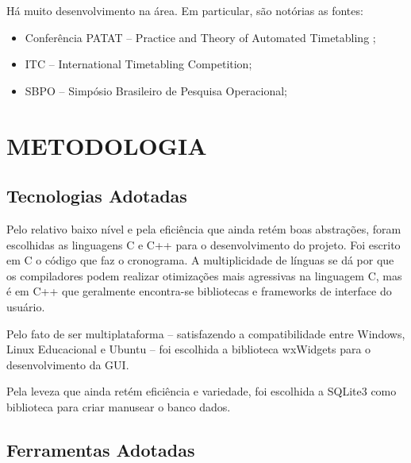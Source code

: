 \documentclass[12pt,a4paper]{article}
\begin{document}
		Há muito desenvolvimento na área. Em particular, são notórias as fontes:

		\begin{itemize}
			\item Conferência PATAT -- Practice and Theory of Automated Timetabling ;
			\item ITC -- International Timetabling Competition;
			\item SBPO -- Simpósio Brasileiro de Pesquisa Operacional;
		\end{itemize}

	\newpage

	\section{METODOLOGIA}

		\subsection{Tecnologias Adotadas}

			\par Pelo relativo baixo nível e pela eficiência que ainda retém boas abstrações, foram escolhidas as linguagens C e C++ para o desenvolvimento do projeto. Foi escrito em C o código que faz o cronograma. A multiplicidade de línguas se dá por que os compiladores podem realizar otimizações mais agressivas na linguagem C, mas é em C++ que geralmente encontra-se bibliotecas e frameworks de interface do usuário.

			\par Pelo fato de ser multiplataforma -- satisfazendo a compatibilidade entre Windows, Linux Educacional e Ubuntu -- foi escolhida a biblioteca wxWidgets para o desenvolvimento da GUI.

			\par Pela leveza que ainda retém eficiência e variedade, foi escolhida a SQLite3 como biblioteca para criar manusear o banco dados.

		\subsection{Ferramentas Adotadas}
\end{document}

